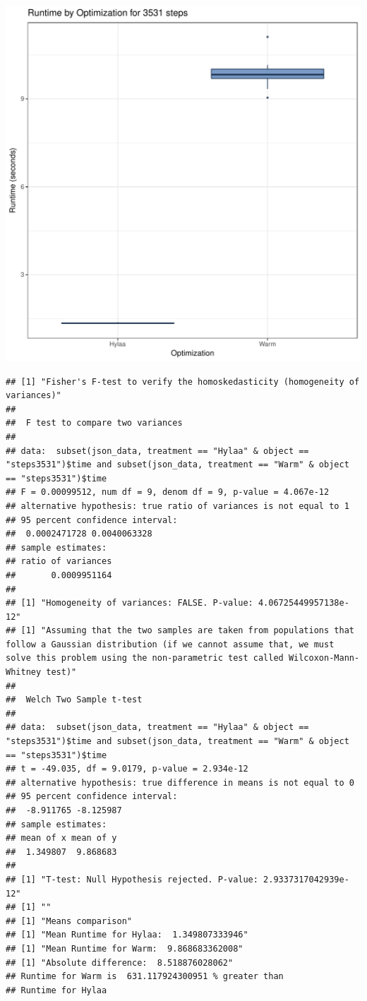 \documentclass{article}\usepackage[]{graphicx}\usepackage[]{color}
\makeatletter
\def\maxwidth{ %
  \ifdim\Gin@nat@width>\linewidth
    \linewidth
  \else
    \Gin@nat@width
  \fi
}
\newenvironment{kframe}{%
 \def\at@end@of@kframe{}%
 \ifinner\ifhmode%
  \def\at@end@of@kframe{\end{minipage}}%
  \begin{minipage}{\columnwidth}%
 \fi\fi%
 \def\FrameCommand##1{\hskip\@totalleftmargin \hskip-\fboxsep
 \colorbox{shadecolor}{##1}\hskip-\fboxsep
     \hskip-\linewidth \hskip-\@totalleftmargin \hskip\columnwidth}%
 \MakeFramed {\advance\hsize-\width
   \@totalleftmargin\z@ \linewidth\hsize
   \@setminipage}}%
 {\par\unskip\endMakeFramed%
 \at@end@of@kframe}
\newenvironment{knitrout}{}{} %
\makeatother
\begin{document}
\begin{knitrout}
\color{fgcolor}
\includegraphics[width=\maxwidth]{figure/RH1_steps3531-1} 
\begin{kframe}\begin{verbatim}
## [1] "Fisher's F-test to verify the homoskedasticity (homogeneity of variances)"
## 
## 	F test to compare two variances
## 
## data:  subset(json_data, treatment == "Hylaa" & object == "steps3531")$time and subset(json_data, treatment == "Warm" & object == "steps3531")$time
## F = 0.00099512, num df = 9, denom df = 9, p-value = 4.067e-12
## alternative hypothesis: true ratio of variances is not equal to 1
## 95 percent confidence interval:
##  0.0002471728 0.0040063328
## sample estimates:
## ratio of variances 
##       0.0009951164 
## 
## [1] "Homogeneity of variances: FALSE. P-value: 4.06725449957138e-12"
## [1] "Assuming that the two samples are taken from populations that follow a Gaussian distribution (if we cannot assume that, we must solve this problem using the non-parametric test called Wilcoxon-Mann-Whitney test)"
## 
## 	Welch Two Sample t-test
## 
## data:  subset(json_data, treatment == "Hylaa" & object == "steps3531")$time and subset(json_data, treatment == "Warm" & object == "steps3531")$time
## t = -49.035, df = 9.0179, p-value = 2.934e-12
## alternative hypothesis: true difference in means is not equal to 0
## 95 percent confidence interval:
##  -8.911765 -8.125987
## sample estimates:
## mean of x mean of y 
##  1.349807  9.868683 
## 
## [1] "T-test: Null Hypothesis rejected. P-value: 2.9337317042939e-12"
## [1] ""
## [1] "Means comparison"
## [1] "Mean Runtime for Hylaa:  1.349807333946"
## [1] "Mean Runtime for Warm:  9.868683362008"
## [1] "Absolute difference:  8.518876028062"
## Runtime for Warm is  631.117924300951 % greater than 
## Runtime for Hylaa
\end{verbatim}
\end{kframe}
\end{knitrout}
\end{document}
